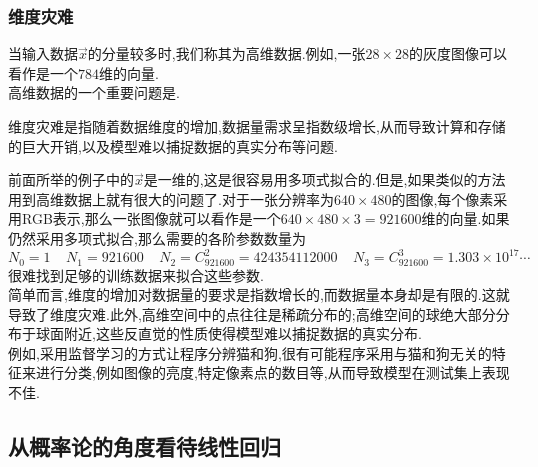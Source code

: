\documentclass{ctexart}
\begin{document}
\subsubsection{维度灾难}
当输入数据$\vec{x}$的分量较多时,我们称其为高维数据.例如,一张$28\times 28$的灰度图像可以看作是一个$784$维的向量.\\
\indent 高维数据的一个重要问题是.
\begin{definition}[维度灾难]
    维度灾难是指随着数据维度的增加,数据量需求呈指数级增长,从而导致计算和存储的巨大开销,以及模型难以捕捉数据的真实分布等问题.
\end{definition}
前面所举的例子中的$\vec{x}$是一维的,这是很容易用多项式拟合的.但是,如果类似的方法用到高维数据上就有很大的问题了.对于一张分辨率为$640\times480$的图像,每个像素采用RGB表示,那么一张图像就可以看作是一个$640\times480\times3=921600$维的向量.如果仍然采用多项式拟合,那么需要的各阶参数数量为
\[N_0=1\ \ \ \ \ N_1=921600\ \ \ \ \ N_2=C_{921600}^2=424354112000\ \ \ \ \ N_3=C_{921600}^3=1.303\times10^{17}\cdots\]
很难找到足够的训练数据来拟合这些参数.\\
\indent 简单而言,维度的增加对数据量的要求是指数增长的,而数据量本身却是有限的.这就导致了维度灾难.此外,高维空间中的点往往是稀疏分布的;高维空间的球绝大部分分布于球面附近,这些反直觉的性质使得模型难以捕捉数据的真实分布.\\
\indent 例如,采用监督学习的方式让程序分辨猫和狗,很有可能程序采用与猫和狗无关的特征来进行分类,例如图像的亮度,特定像素点的数目等,从而导致模型在测试集上表现不佳.
\subsection{从概率论的角度看待线性回归}
\end{document}
